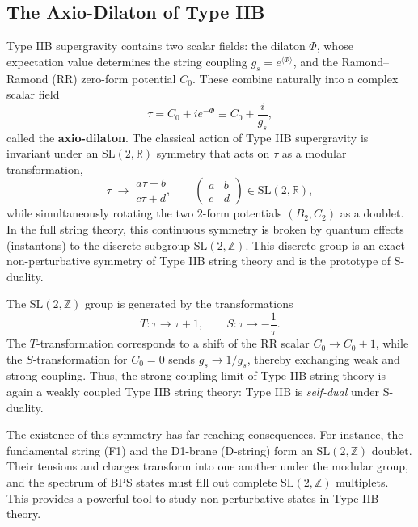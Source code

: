 \documentclass[11pt]{article}
\begin{document}
\subsection{The Axio-Dilaton of Type IIB}
Type IIB supergravity contains two scalar fields: the dilaton $\Phi$, whose expectation value determines the string coupling $g_s = e^{\langle\Phi\rangle}$, and the Ramond--Ramond (RR) zero-form potential $C_0$. These combine naturally into a complex scalar field
\begin{equation}
    \tau = C_0 + i e^{-\Phi} \equiv C_0 + \frac{i}{g_s},
\end{equation}
called the \textbf{axio-dilaton}. The classical action of Type IIB supergravity is invariant under an $\mathrm{SL}(2,\mathbb{R})$ symmetry that acts on $\tau$ as a modular transformation,
\begin{equation}
    \tau \;\to\; \frac{a\tau + b}{c\tau + d}, \qquad \begin{pmatrix} a & b \\ c & d \end{pmatrix} \in \mathrm{SL}(2,\mathbb{R}),
\end{equation}
while simultaneously rotating the two 2-form potentials $(B_2, C_2)$ as a doublet. In the full string theory, this continuous symmetry is broken by quantum effects (instantons) to the discrete subgroup $\mathrm{SL}(2,\mathbb{Z})$. This discrete group is an exact non-perturbative symmetry of Type IIB string theory and is the prototype of S-duality.

The $\mathrm{SL}(2,\mathbb{Z})$ group is generated by the transformations
\begin{equation}
    T : \tau \to \tau + 1, \qquad S : \tau \to -\frac{1}{\tau}.
\end{equation}
The $T$-transformation corresponds to a shift of the RR scalar $C_0 \to C_0 + 1$, while the $S$-transformation for $C_0=0$ sends $g_s \to 1/g_s$, thereby exchanging weak and strong coupling. Thus, the strong-coupling limit of Type IIB string theory is again a weakly coupled Type IIB string theory: Type IIB is \textit{self-dual} under S-duality.

The existence of this symmetry has far-reaching consequences. For instance, the fundamental string (F1) and the D1-brane (D-string) form an $\mathrm{SL}(2,\mathbb{Z})$ doublet. Their tensions and charges transform into one another under the modular group, and the spectrum of BPS states must fill out complete $\mathrm{SL}(2,\mathbb{Z})$ multiplets. This provides a powerful tool to study non-perturbative states in Type IIB theory.
\end{document}

